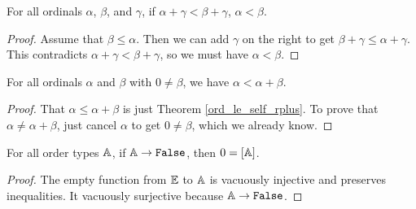 \documentclass[../../math.tex]{subfiles}
\begin{document}
\begin{theorem} \label{ord_lt_plus_rcancel}
    For all ordinals $\alpha$, $\beta$, and $\gamma$, if $\alpha + \gamma <
    \beta + \gamma$, $\alpha < \beta$.
\end{theorem}
\begin{proof}
    Assume that $\beta \leq \alpha$.  Then we can add $\gamma$ on the right to
    get $\beta + \gamma \leq \alpha + \gamma$.  This contradicts $\alpha +
    \gamma < \beta + \gamma$, so we must have $\alpha < \beta$.
\end{proof}

\begin{theorem} \label{ord_lt_self_rplus}
    For all ordinals $\alpha$ and $\beta$ with $0 \neq \beta$, we have $\alpha <
    \alpha + \beta$.
\end{theorem}
\begin{proof}
    That $\alpha \leq \alpha + \beta$ is just Theorem \ref{ord_le_self_rplus}.
    To prove that $\alpha \neq \alpha + \beta$, just cancel $\alpha$ to get $0
    \neq \beta$, which we already know.
\end{proof}

\begin{theorem} \label{ord_false_0}
    For all order types $\mathbb{A}$, if $\A \to \verb|False|$, then $0 = [\mathbb{A}]$.
\end{theorem}
\begin{proof}
    The empty function from $\mathbb{E}$ to $\mathbb{A}$ is vacuously injective and preserves
    inequalities.  It vacuously surjective because $\A \to \verb|False|$.
\end{proof}
\end{document}
